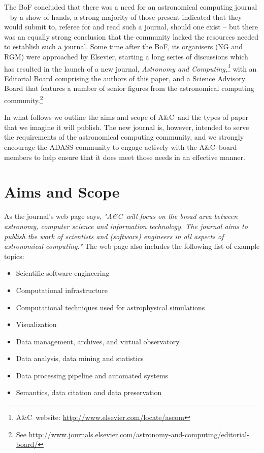 \documentclass[11pt,twoside]{article}
\newcommand{\ac}{A\&C}
\begin{document}
The BoF concluded that there was a need for an astronomical computing journal -- by a show of hands, a strong majority of those present indicated that they would submit to, referee for and read such a journal, should one exist -- but there was an equally strong conclusion that the community lacked the resources needed to establish such a journal. Some time after the BoF, its organisers (NG and RGM) were approached by Elsevier, starting a long series of discussions which has resulted in the launch of a new journal, {\em Astronomy and Computing,\footnote{\ac\ website: \url{ http://www.elsevier.com/locate/ascom}} \/} with an Editorial Board comprising the authors of this paper, and a Science Advisory Board that features a number of senior figures from the astronomical computing community.\footnote{See \url{http://www.journals.elsevier.com/astronomy-and-computing/editorial-board/}} 

In what follows we outline the aims and scope of \ac\ and the types of paper that we imagine it will publish. The new journal is, however, intended to serve the requirements of the astronomical computing community, and we strongly encourage the ADASS community to engage actively with the \ac\ board members to help ensure that it does meet those needs in an effective manner. 

\section{Aims and Scope}

As the journal's web page  says, {\em "\ac\ will focus on the broad area between
astronomy, computer science and information technology. The journal
aims to publish the work of scientists and (software) engineers in all
aspects of astronomical computing."\/} The web page also includes the following list of example topics:
\begin{itemize}
\setlength{\itemsep}{1pt}
  \setlength{\parskip}{0pt}
  \setlength{\parsep}{0pt}

\item Scientific software engineering

\item Computational infrastructure

\item Computational techniques used for astrophysical simulations

\item Visualization

\item Data management, archives, and virtual observatory

\item Data analysis, data mining and statistics

 \item Data processing pipeline and automated systems

\item  Semantics, data citation and data preservation


\end{itemize}
\end{document}
